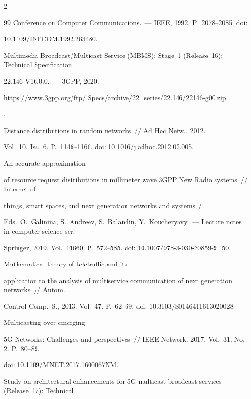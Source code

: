 \begin{multicols}{2}
{{\begin{thebibliography}{99}
Conference on Computer Communications.~--- IEEE, 1992. P.~2078--2085. doi: 

10.1109/INFCOM.1992.263480. 


Multimedia Broadcast/Multicast Service (MBMS); Stage~1 (Release~16): Technical Specification 

22.146 V16.0.0.~--- 3GPP, 2020. {\sf  

https://www.3gpp.org/ftp/ Specs/archive/22\_series/22.146/22146-g00.zip}.


 Distance distributions in random networks~// Ad Hoc Netw., 2012. 

Vol.~10. Iss.~6. P.~1146--1166. doi: 10.1016/j.adhoc.2012.02.005.


 An accurate approximation 

of resource request distributions in millimeter wave 3GPP New Radio systems~// Internet of 

things, smart spaces, and next generation networks and systems~/

Eds.\ O.~Galinina, S.~Andreev, S.~Balandin, Y.~Koucheryavy.~--- Lecture notes in computer science ser.~--- 

Springer, 2019. Vol.~11660. P.~572--585. doi: 10.1007/978-3-030-30859-9\_50.


 Mathematical theory of teletraffic and its 

application to the analysis of multiservice communication of next generation networks~// Autom. 

Control Comp.~S., 2013. Vol.~47. P.~62--69. doi:  10.3103/S0146411613020028.




 Multicasting over emerging 

5G Networks: Challenges and perspectives~// IEEE Network, 2017. Vol.~31. No.\,2. P.~80--89. 

doi: 10.1109/MNET.2017.1600067NM.




Study on architectural enhancements for 5G multicast-broadcast services (Release~17): Technical 


\end{thebibliography}}}
\end{multicols}
